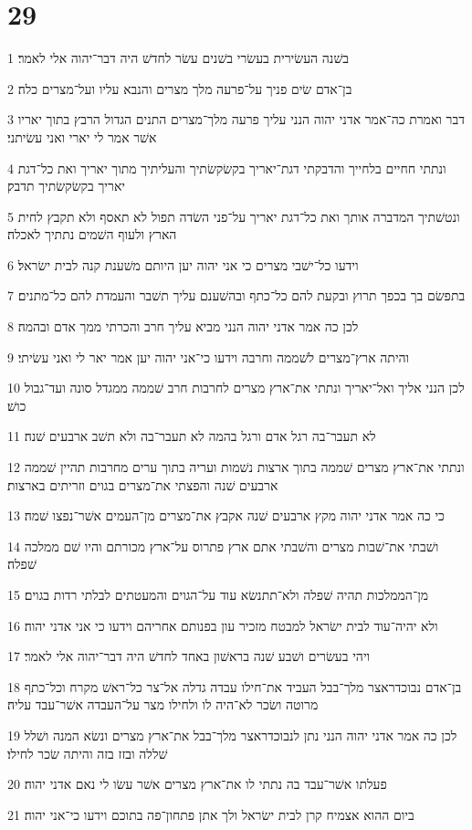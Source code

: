 \chapter{29}

\par 1 בשׁנה העשׂירית בעשׂרי בשׁנים עשׂר לחדשׁ היה דבר־יהוה אלי לאמר׃
\par 2 בן־אדם שׂים פניך על־פרעה מלך מצרים והנבא עליו ועל־מצרים כלה׃
\par 3 דבר ואמרת כה־אמר אדני יהוה הנני עליך פרעה מלך־מצרים התנים הגדול הרבץ בתוך יאריו אשׁר אמר לי יארי ואני עשׂיתני׃
\par 4 ונתתי חחיים בלחייך והדבקתי דגת־יאריך בקשׂקשׂתיך והעליתיך מתוך יאריך ואת כל־דגת יאריך בקשׂקשׂתיך תדבק׃
\par 5 ונטשׁתיך המדברה אותך ואת כל־דגת יאריך על־פני השׂדה תפול לא תאסף ולא תקבץ לחית הארץ ולעוף השׁמים נתתיך לאכלה׃
\par 6 וידעו כל־ישׁבי מצרים כי אני יהוה יען היותם משׁענת קנה לבית ישׂראל׃
\par 7 בתפשׂם בך בכפך תרוץ ובקעת להם כל־כתף ובהשׁענם עליך תשׁבר והעמדת להם כל־מתנים׃
\par 8 לכן כה אמר אדני יהוה הנני מביא עליך חרב והכרתי ממך אדם ובהמה׃
\par 9 והיתה ארץ־מצרים לשׁממה וחרבה וידעו כי־אני יהוה יען אמר יאר לי ואני עשׂיתי׃
\par 10 לכן הנני אליך ואל־יאריך ונתתי את־ארץ מצרים לחרבות חרב שׁממה ממגדל סונה ועד־גבול כושׁ׃
\par 11 לא תעבר־בה רגל אדם ורגל בהמה לא תעבר־בה ולא תשׁב ארבעים שׁנה׃
\par 12 ונתתי את־ארץ מצרים שׁממה בתוך ארצות נשׁמות ועריה בתוך ערים מחרבות תהיין שׁממה ארבעים שׁנה והפצתי את־מצרים בגוים וזריתים בארצות׃
\par 13 כי כה אמר אדני יהוה מקץ ארבעים שׁנה אקבץ את־מצרים מן־העמים אשׁר־נפצו שׁמה׃
\par 14 ושׁבתי את־שׁבות מצרים והשׁבתי אתם ארץ פתרוס על־ארץ מכורתם והיו שׁם ממלכה שׁפלה׃
\par 15 מן־הממלכות תהיה שׁפלה ולא־תתנשׂא עוד על־הגוים והמעטתים לבלתי רדות בגוים׃
\par 16 ולא יהיה־עוד לבית ישׂראל למבטח מזכיר עון בפנותם אחריהם וידעו כי אני אדני יהוה׃
\par 17 ויהי בעשׂרים ושׁבע שׁנה בראשׁון באחד לחדשׁ היה דבר־יהוה אלי לאמר׃
\par 18 בן־אדם נבוכדראצר מלך־בבל העביד את־חילו עבדה גדלה אל־צר כל־ראשׁ מקרח וכל־כתף מרוטה ושׂכר לא־היה לו ולחילו מצר על־העבדה אשׁר־עבד עליה׃
\par 19 לכן כה אמר אדני יהוה הנני נתן לנבוכדראצר מלך־בבל את־ארץ מצרים ונשׂא המנה ושׁלל שׁללה ובזז בזה והיתה שׂכר לחילו׃
\par 20 פעלתו אשׁר־עבד בה נתתי לו את־ארץ מצרים אשׁר עשׂו לי נאם אדני יהוה׃
\par 21 ביום ההוא אצמיח קרן לבית ישׂראל ולך אתן פתחון־פה בתוכם וידעו כי־אני יהוה׃

